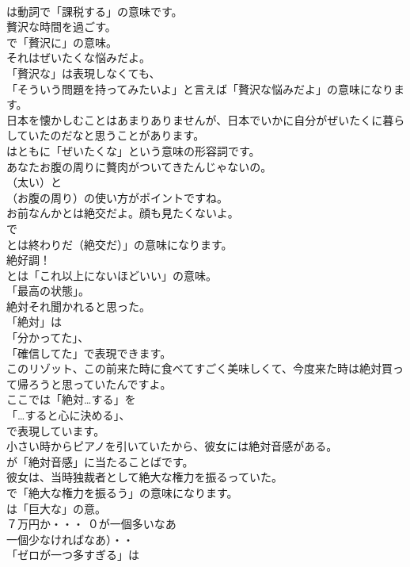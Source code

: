 \documentclass[8pt]{extreport}
\begin{document}
\begin{CJK}{UTF8}{min}
\\	は動詞で「課税する」の意味です。	
\\	贅沢な時間を過ごす。 
\\	で「贅沢に」の意味。	
\\	それはぜいたくな悩みだよ。 
\\	「贅沢な」は表現しなくても、
\\	「そういう問題を持ってみたいよ」と言えば「贅沢な悩みだよ」の意味になります。	
\\	日本を懐かしむことはあまりありませんが、日本でいかに自分がぜいたくに暮らしていたのだなと思うことがあります。 
\\	はともに「ぜいたくな」という意味の形容詞です。	
\\	あなたお腹の周りに贅肉がついてきたんじゃないの。 
\\	（太い）と
\\	（お腹の周り）の使い方がポイントですね。	
\\	お前なんかとは絶交だよ。顔も見たくないよ。 
\\	で
\\	とは終わりだ（絶交だ）」の意味になります。	
\\	絶好調！ 
\\	とは「これ以上にないほどいい」の意味。
\\	「最高の状態」。	
\\	絶対それ聞かれると思った。 
\\	「絶対」は
\\	「分かってた」、
\\	「確信してた」で表現できます。	
\\	このリゾット、この前来た時に食べてすごく美味しくて、今度来た時は絶対買って帰ろうと思っていたんですよ。 
\\	ここでは「絶対…する」を
\\	「…すると心に決める」、
\\	で表現しています。	
\\	小さい時からピアノを引いていたから、彼女には絶対音感がある。 
\\	が「絶対音感」に当たることばです。	
\\	彼女は、当時独裁者として絶大な権力を振るっていた。 
\\	で「絶大な権力を振るう」の意味になります。
\\	は「巨大な」の意。	
\\	７万円か・・・ ０が一個多いなあ
\\	一個少なければなあ）・・ 
\\	「ゼロが一つ多すぎる」は

\end{CJK}
\end{document}
